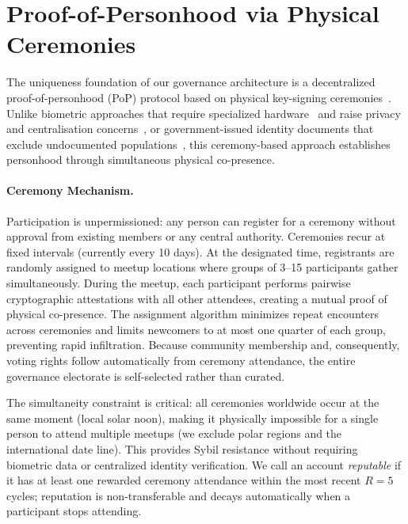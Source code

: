 \documentclass{svproc}
\begin{document}
\section{Proof-of-Personhood via Physical Ceremonies}
\label{sec:pop}

The uniqueness foundation of our governance architecture is a decentralized proof-of-personhood (PoP) protocol based on physical key-signing ceremonies~\cite{brenzikofer2019encointer}. Unlike biometric approaches that require specialized hardware~\cite{worldcoin2023} and raise privacy and centralisation concerns~\cite{buterin2023biometric}, or government-issued identity documents that exclude undocumented populations~\cite{ford2020identity}, this ceremony-based approach establishes personhood through simultaneous physical co-presence.

\paragraph{Ceremony Mechanism.}
Participation is unpermissioned: any person can register for a ceremony without approval from existing members or any central authority. Ceremonies recur at fixed intervals (currently every 10 days). At the designated time, registrants are randomly assigned to meetup locations where groups of 3--15 participants gather simultaneously. During the meetup, each participant performs pairwise cryptographic attestations with all other attendees, creating a mutual proof of physical co-presence. The assignment algorithm minimizes repeat encounters across ceremonies and limits newcomers to at most one quarter of each group, preventing rapid infiltration. Because community membership and, consequently, voting rights follow automatically from ceremony attendance, the entire governance electorate is self-selected rather than curated.

The simultaneity constraint is critical: all ceremonies worldwide occur at the same moment (local solar noon), making it physically impossible for a single person to attend multiple meetups (we exclude polar regions and the international date line). This provides Sybil resistance without requiring biometric data or centralized identity verification. We call an account \emph{reputable} if it has at least one rewarded ceremony attendance within the most recent $R = 5$ cycles; reputation is non-transferable and decays automatically when a participant stops attending.
\end{document}
